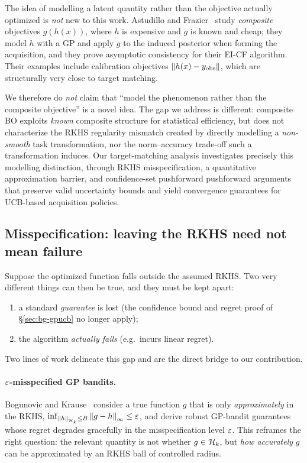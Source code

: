 The idea of modelling a latent quantity rather than the objective actually
optimized is \emph{not} new to this work. Astudillo and
Frazier~\cite{astudillo2019} study \emph{composite} objectives $g(h(x))$, where
$h$ is expensive and $g$ is known and cheap; they model $h$ with a GP and apply
$g$ to the induced posterior when forming the acquisition, and they prove
asymptotic consistency for their EI-CF algorithm. Their examples include
calibration objectives $\left\lVert h(x)-y_{\mathrm{obs}}\right\rVert$, which are structurally very
close to target matching. \hfill\Plit

We therefore do \emph{not} claim that ``model the phenomenon rather than the
composite objective'' is a novel idea. The gap we address is different: composite
BO exploits \emph{known} composite structure for statistical efficiency, but does
not characterize the RKHS regularity mismatch created by directly modelling a
\emph{non-smooth} task transformation, nor the norm--accuracy trade-off such a
transformation induces. Our target-matching analysis investigates precisely this
modelling distinction, through RKHS misspecification, a quantitative
approximation barrier, and confidence-set pushforward pushforward arguments that preserve valid uncertainty bounds and yield convergence guarantees for UCB-based acquisition policies.
\hfill\Psynth

\subsection{Misspecification: leaving the RKHS need not mean failure}
\label{sec:bg-misspec}

Suppose the optimized function falls outside the assumed RKHS. Two very different
things can then be true, and they must be kept apart:
\begin{enumerate}
  \item a standard \emph{guarantee} is lost (the confidence bound and regret
        proof of \S\ref{sec:bg-gpucb} no longer apply);
  \item the algorithm \emph{actually fails} (e.g.\ incurs linear regret).
\end{enumerate}
Two lines of work delineate this gap and are the direct bridge to our
contribution.

\paragraph{$\varepsilon$-misspecified GP bandits.}
Bogunovic and Krause~\cite{bogunovic2021} consider a true function $g$ that is
only \emph{approximately} in the RKHS,
$\inf_{\left\lVert h\right\rVert_{\mathcal{H}_k}\le B}\left\lVert g-h\right\rVert_\infty\le\varepsilon$, and derive robust GP-bandit
guarantees whose regret degrades gracefully in the misspecification level $\varepsilon$.
This reframes the right question: the relevant quantity is not whether
$g\in\mathcal{H}_k$, but \emph{how accurately} $g$ can be approximated by an RKHS ball of
controlled radius. \hfill\Plit

